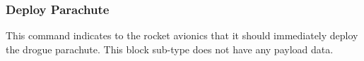 \subsubsection{Deploy Parachute}

This command indicates to the rocket avionics that it should immediately deploy the drogue parachute. This block
sub-type does not have any payload data.
